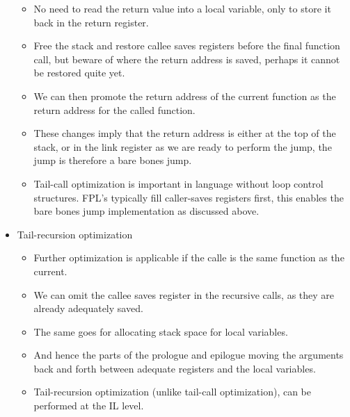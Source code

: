 \begin{itemize}
\begin{itemize}
\item No need to read the return value into a local variable, only to store it
back in the return register.

\item Free the stack and restore callee saves registers before the final
function call, but beware of where the return address is saved, perhaps it
cannot be restored quite yet.

\item We can then promote the return address of the current function as the
return address for the called function.

\item These changes imply that the return address is either at the top of the
stack, or in the link register as we are ready to perform the jump, the jump is
therefore a bare bones jump.

\item Tail-call optimization is important in language without loop control
structures. FPL's typically fill caller-saves registers first, this enables the
bare bones jump implementation as discussed above. 

\end{itemize}

\item Tail-recursion optimization

\begin{itemize}

\item Further optimization is applicable if the calle is the same function as
the current.

\item We can omit the callee saves register in the recursive calls, as they are
already adequately saved.

\item The same goes for allocating stack space for local variables.

\item And hence the parts of the prologue and epilogue moving the arguments
back and forth between adequate registers and the local variables.

\item Tail-recursion optimization (unlike tail-call optimization), can be
performed at the IL level.

\end{itemize}

\end{itemize}

